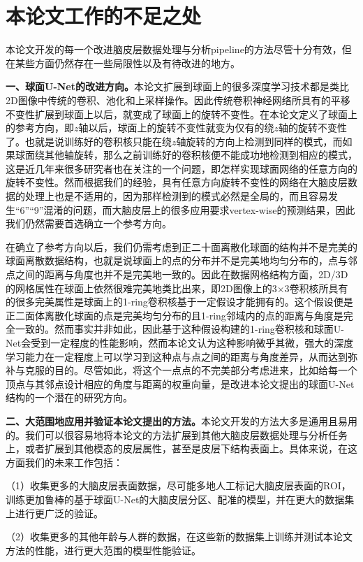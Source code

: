 \section{本论文工作的不足之处}
本论文开发的每一个改进脑皮层数据处理与分析pipeline的方法尽管十分有效，但在某些方面仍然存在一些局限性以及有待改进的地方。

\textbf{一、球面U-Net的改进方向。}本论文扩展到球面上的很多深度学习技术都是类比2D图像中传统的卷积、池化和上采样操作。因此传统卷积神经网络所具有的平移不变性扩展到球面上以后，就变成了球面上的旋转不变性。在本论文定义了球面上的参考方向，即$z$轴以后，球面上的旋转不变性就变为仅有的绕$z$轴的旋转不变性了。也就是说训练好的卷积核只能在绕$z$轴旋转的方向上检测到同样的模式，而如果球面绕其他轴旋转，那么之前训练好的卷积核便不能成功地检测到相应的模式，这是近几年来很多研究者也在关注的一个问题\cite{esteves2018learning,cohen2018spherical,cohen2019gauge}，即怎样实现球面网络的任意方向的旋转不变性。然而根据我们的经验，具有任意方向旋转不变性的网络在大脑皮层数据的处理上也是不适用的，因为那样检测到的模式必然是全局的，而且容易发生“6”“9”混淆的问题，而大脑皮层上的很多应用要求vertex-wise的预测结果，因此我们仍然需要首选确立一个参考方向。

在确立了参考方向以后，我们仍需考虑到正二十面离散化球面的结构并不是完美的球面离散数据结构，也就是说球面上的点的分布并不是完美地均匀分布的，点与邻点之间的距离与角度也并不是完美地一致的。因此在数据网格结构方面，2D/3D的网格属性在球面上依然很难完美地类比出来，即2D图像上的3$\times$3卷积核所具有的很多完美属性是球面上的1-ring卷积核基于一定假设才能拥有的。这个假设便是正二面体离散化球面的点是完美均匀分布的且1-ring邻域内的点的距离与角度是完全一致的。然而事实并非如此，因此基于这种假设构建的1-ring卷积核和球面U-Net会受到一定程度的性能影响，然而本论文认为这种影响微乎其微，强大的深度学习能力在一定程度上可以学习到这种点与点之间的距离与角度差异，从而达到弥补与克服的目的。尽管如此，将这个一点点的不完美部分考虑进来，比如给每一个顶点与其邻点设计相应的角度与距离的权重向量，是改进本论文提出的球面U-Net结构的一个潜在的研究方向。

\textbf{二、大范围地应用并验证本论文提出的方法。}本论文开发的方法大多是通用且易用的。我们可以很容易地将本论文的方法扩展到其他大脑皮层数据处理与分析任务上，或者扩展到其他模态的皮层属性，甚至是皮层下结构表面上。具体来说，在这方面我们的未来工作包括：

（1）收集更多的大脑皮层表面数据，尽可能多地人工标记大脑皮层表面的ROI，训练更加鲁棒的基于球面U-Net的大脑皮层分区、配准的模型，并在更大的数据集上进行更广泛的验证。

（2）收集更多的其他年龄与人群的数据，在这些新的数据集上训练并测试本论文方法的性能，进行更大范围的模型性能验证。

